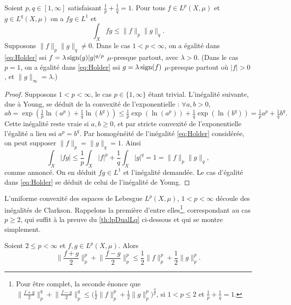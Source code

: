 \begin{theorem}	
\label{th:HolderIneq}
%
Soient $p,q\in [1,\infty]$ satisfaisant $\frac 1 p + \frac 1 q = 1$. Pour tous $f\in L^p(X,\mu)$ et $g\in L^q(X,\mu)$ on a $fg \in L^1$ et 
\begin{equation}
\label{eq:Holder}
	\int_X f g \leq \|f\|_p \|g\|_q.
\end{equation}
Supposons $\|f\|_p \|g\|_q \neq 0$. Dans le cas $1< p < \infty$, on a égalité dans \eqref{eq:Holder} ssi $f = \lambda \operatorname{sign}(g) |g|^{q/p}$ $\mu$-presque partout, avec $\lambda > 0$. (Dans le cas $p=1$, on a égalité dans \eqref{eq:Holder} ssi $g = \lambda \operatorname{sign}(f)$ $\mu$-presque partout où $|f|>0$, et $\|g\|_\infty = \lambda$.)
\end{theorem}
\begin{proof}
Supposons $1 < p < \infty$, le cas $p \in \{1,\infty\}$ étant trivial. 
L'inégalité suivante, due à Young, se déduit de la convexité de l'exponentielle : $\forall a,b>0$,
\begin{equation*}
	a b = \exp(\tfrac 1 p \ln(a^p) + \tfrac 1 q \ln(b^q)) \leq \tfrac 1 p \exp(\ln(a^p)) + \tfrac 1 q \exp(\ln(b^q)) = \tfrac 1 p a^p + \tfrac 1 q b^q.
\end{equation*}
Cette inégalité reste vraie si $a,b\geq 0$, et par stricte convexité de l'exponentielle l'égalité a lieu ssi $a^p = b^q$.
Par homogénéité de l'inégalité \eqref{eq:Holder} considérée, on peut supposer $\|f\|_p = \|g\|_q = 1$. Ainsi 
\begin{equation*}
	\int_X |fg| \leq \frac 1 p \int_X |f|^p + \frac 1 q \int_X |g|^q = 1 = \|f\|_p  \|g\|_q,
\end{equation*}
comme annoncé. On en déduit $fg \in L^1$ et l'inégalité demandée. Le cas d'égalité dans \eqref{eq:Holder} se déduit de celui de l'inégalité de Young. 
\end{proof}

L'uniforme convexité des espaces de Lebesgue $L^p(X,\mu)$, $1 < p < \infty$ découle des inégalités de Clarkson.
Rappelons la première d'entre elles\footnote{
Pour être complet, la seconde énonce que 
$
\big\|\frac{f+g} 2\big\|_p^q + \big\|\frac{f-g} 2\big\|_p^q \leq \big(\frac 1 2 \|f\|_p^p + \frac 1 2 \|g\|_p^p\big)^\frac q p
$,
si $1<p \leq 2$ et $\frac 1 p + \frac 1 q =1$.
}, correspondant au cas $p \geq 2$, qui suffit à la preuve du \cref{th:lpDualLq} ci-dessous et qui se montre simplement.

\begin{proposition}
\label{prop:ClarksonIneq}
%
Soient $2 \leq p < \infty$ et $f,g\in L^p(X,\mu)$. Alors
	\begin{equation*}
		\Big\|\frac{f+g} 2\Big\|_p^p + \Big\|\frac{f-g} 2\Big\|_p^p \leq \frac 1 2 \|f\|_p^p + \frac 1 2 \|g\|_p^p.
	\end{equation*}
\end{proposition}

